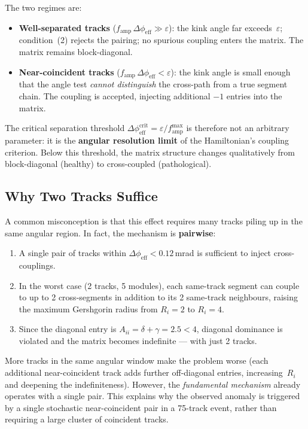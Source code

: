 \documentclass[12pt,a4paper]{article}
\newcommand{\eps}{\varepsilon}
\begin{document}
The two regimes are:
\begin{itemize}
  \item \textbf{Well-separated tracks}
    ($f_\text{amp}\,\Delta\phi_\text{eff} \gg \eps$):
    the kink angle far exceeds~$\eps$; condition~(2) rejects the pairing;
    no spurious coupling enters the matrix.  The matrix remains
    block-diagonal.
  \item \textbf{Near-coincident tracks}
    ($f_\text{amp}\,\Delta\phi_\text{eff} < \eps$):
    the kink angle is small enough that the angle test \emph{cannot
    distinguish} the cross-path from a true segment chain.  The coupling
    is accepted, injecting additional $-1$ entries into the matrix.
\end{itemize}

\noindent The critical separation threshold
$\Delta\phi_\text{eff}^\text{crit} = \eps / f_\text{amp}^{\max}$
is therefore not an arbitrary parameter: it is the
\textbf{angular resolution limit} of the Hamiltonian's coupling criterion.
Below this threshold, the matrix structure changes qualitatively from
block-diagonal (healthy) to cross-coupled (pathological).

\subsection{Why Two Tracks Suffice}
\label{sec:two_tracks}

A common misconception is that this effect requires many tracks piling up
in the same angular region.  In fact, the mechanism is \textbf{pairwise}:

\begin{enumerate}
  \item A single pair of tracks within $\Delta\phi_\text{eff} < 0.12$\,mrad
    is sufficient to inject cross-couplings.
  \item In the worst case (2 tracks, 5 modules), each same-track segment
    can couple to up to 2 cross-segments in addition to its 2 same-track
    neighbours, raising the maximum Gershgorin radius from $R_i = 2$ to
    $R_i = 4$.
  \item Since the diagonal entry is $A_{ii} = \delta + \gamma = 2.5 < 4$,
    diagonal dominance is violated and the matrix becomes indefinite ---
    with just 2 tracks.
\end{enumerate}

\noindent More tracks in the same angular window make the problem worse
(each additional near-coincident track adds further off-diagonal entries,
increasing~$R_i$ and deepening the indefiniteness).
However, the \emph{fundamental mechanism} already operates with a single
pair.  This explains why the observed anomaly is triggered by a single
stochastic near-coincident pair in a 75-track event, rather than requiring
a large cluster of coincident tracks.
\end{document}
